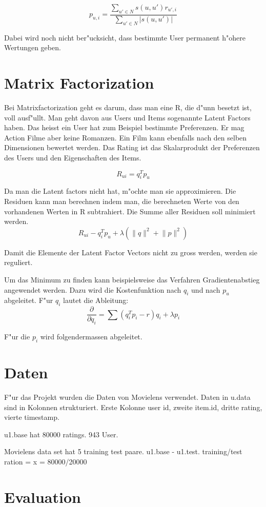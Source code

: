 \documentclass[a4paper, 11pt]{article}
\begin{document}
\begin{equation}
  \label{eq:computeprediction}
  p_{u,i} = \frac{\sum_{u' \in N}{s(u,u') r_{u',i}}}{\sum_{u' \in N}{|s(u,u')|}}
\end{equation}

Dabei wird noch nicht ber"ucksicht, dass bestimmte User permanent h"ohere Wertungen geben.

\section{Matrix Factorization}
\label{sec:matrixfactorization}

Bei Matrixfactorization geht es darum, dass man eine R, die d"unn besetzt ist, voll ausf"ullt. Man geht davon aus Users und Items sogenannte Latent Factors haben. Das heisst ein User hat zum Beispiel bestimmte Preferenzen. Er mag Action Filme aber keine Romanzen. Ein Film kann ebenfalls nach den selben Dimensionen bewertet werden. Das Rating ist das Skalarprodukt der Preferenzen des Users und den Eigenschaften des Items.

\begin{equation}
  \label{eq:latentfactors}
  R_{ui} = q_i^T p_u
\end{equation}

Da man die Latent factors nicht hat, m"ochte man sie approximieren. Die Residuen kann man berechnen indem man, die berechneten Werte von den vorhandenen Werten in R subtrahiert. Die Summe aller Residuen soll minimiert werden.
\begin{equation}
  \label{eq:optimization}
    R_{ui} - q_i^T p_u + \lambda (\lVert q \rVert^2 + \lVert p \lVert ^2)
\end{equation}

Damit die Elemente der Latent Factor Vectors nicht zu gross werden, werden sie reguliert.
 
Um das Minimum zu finden kann beispielsweise das Verfahren Gradientenabstieg angewendet werden. Dazu wird die Kostenfunktion nach $q_i$ und nach $p_u$ abgeleitet. F"ur $q_i$ lautet die Ableitung:
\begin{equation}
  \label{eq:decx}
  \frac{ \partial }{ \partial q_i } = \sum (q_i^T p_i - r) q_i + \lambda p_i
\end{equation}

F"ur die $p_i$ wird folgendermassen abgeleitet.

\section{Daten}
\label{sec:data}

F"ur das Projekt wurden die Daten von Movielens verwendet. Daten in u.data sind in Kolonnen strukturiert. Erste Kolonne user id, zweite item.id, dritte rating, vierte timestamp. 

u1.base hat 80000 ratings. 943 User.

Movielens data set hat 5 training test paare. u1.base - u1.test. 
training/test ration = x = 80000/20000



\section{Evaluation}
\label{sec:evaluation}
\end{document}
